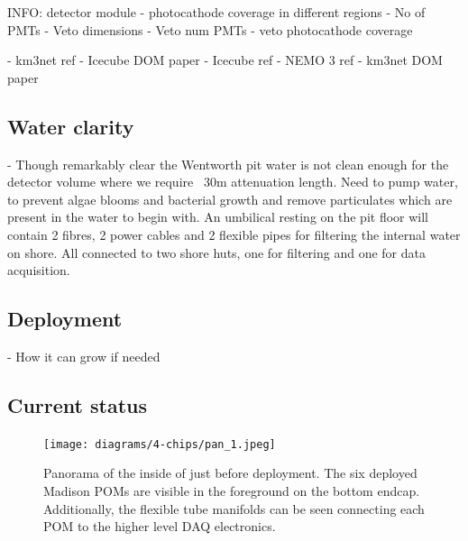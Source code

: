 INFO: detector module
- photocathode coverage in different regions
- No of PMTs
- Veto dimensions
- Veto num PMTs
- veto photocathode coverage

- km3net ref \cite{katz2009, adrian2016}
- Icecube DOM paper \cite{hanson2006}
- Icecube ref \cite{karle2003}
- NEMO 3 ref \cite{arnold2005}
- km3net DOM paper \cite{eijk2015}

\subsection{Water clarity} %
\label{sec:chips_detector_water} %

- Though remarkably clear the Wentworth pit water is not clean enough for the detector volume
where we require ~30m attenuation length. Need to pump water, to prevent algae blooms and
bacterial growth and remove particulates which are present in the water to begin with. An
umbilical resting on the pit floor will contain 2 fibres, 2 power cables and 2 flexible pipes for
filtering the internal water on shore. All connected to two shore huts, one for filtering and one
for data acquisition.

\subsection{Deployment} %
\label{sec:chips_detector_deployment} %

- How it can grow if needed

\subsection{Current status} %
\label{sec:chips_detector_status} %

\begin{figure} %
    \texttt{[image: diagrams/4-chips/pan\_1.jpeg]}
    \caption[Panorama of the inside of \chipsfive just before deployment.]
    {Panorama of the inside of \chipsfive just before deployment. The six deployed Madison POMs
        are visible in the foreground on the bottom endcap. Additionally, the flexible tube manifolds
        can be seen connecting each POM to the higher level DAQ electronics.}
    \label{fig:pan_1}
\end{figure}

